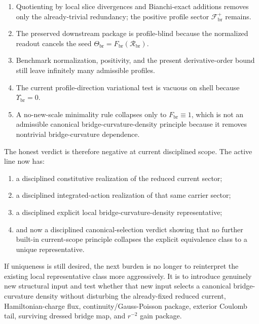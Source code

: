 \documentclass[11pt]{article}
\newcommand{\CurvSeed}{\Theta_{\mathrm{br}}}
\newcommand{\CurvSeedMult}{\Upsilon_{\mathrm{br}}}
\newcommand{\CurvProfile}{F_{\mathrm{br}}}
\newcommand{\BridgeCurv}{\mathcal R_{\mathrm{br}}}
\newcommand{\CurvFamily}{\mathscr F_{\mathrm{br}}^{+}}
\begin{document}
\begin{enumerate}
    \item Quotienting by local slice divergences and Bianchi-exact additions removes only the already-trivial redundancy; the positive profile sector \(\CurvFamily\) remains.
    \item The preserved downstream package is profile-blind because the normalized readout cancels the seed \(\CurvSeed=\CurvProfile(\BridgeCurv)\).
    \item Benchmark normalization, positivity, and the present derivative-order bound still leave infinitely many admissible profiles.
    \item The current profile-direction variational test is vacuous on shell because \(\CurvSeedMult=0\).
    \item A no-new-scale minimality rule collapses only to \(\CurvProfile\equiv1\), which is not an admissible canonical bridge-curvature-density principle because it removes nontrivial bridge-curvature dependence.
\end{enumerate}

The honest verdict is therefore negative at current disciplined scope. The active line now has:
\begin{enumerate}
    \item a disciplined constitutive realization of the reduced current sector;
    \item a disciplined integrated-action realization of that same carrier sector;
    \item a disciplined explicit local bridge-curvature-density representative;
    \item and now a disciplined canonical-selection verdict showing that no further built-in current-scope principle collapses the explicit equivalence class to a unique representative.
\end{enumerate}

If uniqueness is still desired, the next burden is no longer to reinterpret the existing local representative class more aggressively. It is to introduce genuinely new structural input and test whether that new input selects a canonical bridge-curvature density without disturbing the already-fixed reduced current, Hamiltonian-charge flux, continuity/Gauss-Poisson package, exterior Coulomb tail, surviving dressed bridge map, and \(r^{-2}\) gain package.
\end{document}
